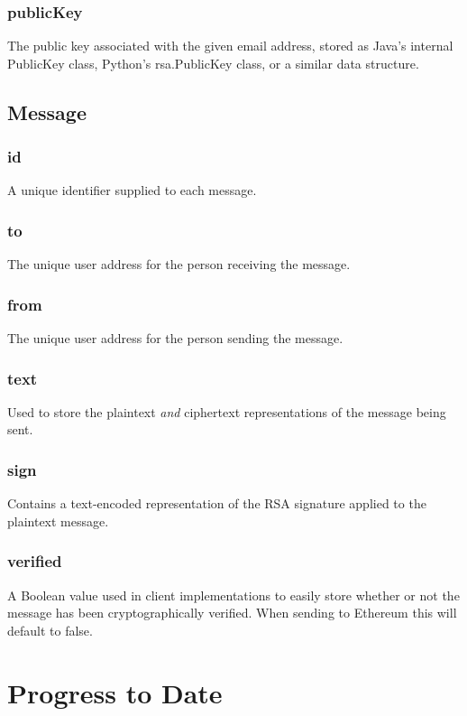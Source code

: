 \documentclass[titlepage]{report}
\begin{document}
\subsubsection{publicKey}
The public key associated with the given email address, stored as Java's internal PublicKey class, Python's rsa.PublicKey class, or a similar data structure.

\subsection{Message}
\subsubsection{id}
A unique identifier supplied to each message.

\subsubsection{to}
The unique user address for the person receiving the message.

\subsubsection{from}
The unique user address for the person sending the message.

\subsubsection{text}
Used to store the plaintext \textit{and} ciphertext representations of the message being sent.

\subsubsection{sign}
Contains a text-encoded representation of the RSA signature applied to the plaintext message.

\subsubsection{verified}
A Boolean value used in client implementations to easily store whether or not the message has been cryptographically verified. When sending to Ethereum this will default to false.

\pagebreak

\section{Progress to Date}
\end{document}
